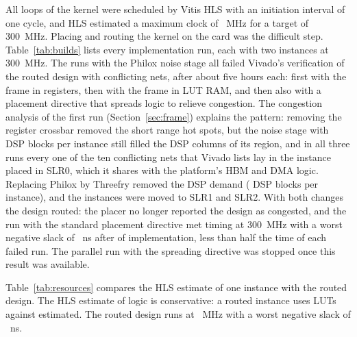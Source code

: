 All loops of the kernel were scheduled by Vitis HLS with an initiation interval of one cycle, and HLS estimated a
maximum clock of \NumHlsFmax{}~MHz for a target of 300~MHz. Placing and routing the kernel on the card was the
difficult step. Table~\ref{tab:builds} lists every implementation run, each with two instances at 300~MHz. The
\NumFailedBuilds{} runs with the Philox noise stage all failed Vivado's verification of the routed design with
conflicting nets, after about five hours each: first with the frame in registers, then with the frame in LUT RAM, and
then also with a placement directive that spreads logic to relieve congestion. The congestion analysis of the first
run (Section~\ref{sec:frame}) explains the pattern: removing the register crossbar removed the short range hot spots,
but the noise stage with \NumPhiloxDsp{} DSP blocks per instance still filled the DSP columns of its region, and in
all three runs every one of the ten conflicting nets that Vivado lists lay in the instance placed in SLR0, which it
shares with the platform's HBM and DMA logic. Replacing Philox by Threefry removed the DSP demand (\NumHlsDsp{} DSP blocks per instance), and the
instances were moved to SLR1 and SLR2. With both changes the design routed: the placer no longer reported the
design as congested, and the run with the standard placement directive met timing at 300~MHz with a worst negative
slack of \NumWns{}~ns after \NumTfImplTime{} of implementation, less than half the time of each failed run. The
parallel run with the spreading directive was stopped once this result was available.

\begin{table}[t]
\caption{Implementation runs of the kernel on the Alveo U55C, two instances at a 300~MHz target. Frame: frame stage
storage. Generator: Philox4x32-10 or Threefry4x32-20. SLRs: the regions of the two instances. Placement: Vivado
directive ExtraTimingOpt (timing) or AltSpreadLogic\_high (spread). DSP: DSP blocks per instance (HLS). Time: Vivado
placement and routing. All runs used the
same post route optimisation settings.}\label{tab:builds}

\end{table}

Table~\ref{tab:resources} compares the HLS estimate of one instance with the routed design. The HLS estimate of logic is
conservative: a routed instance uses \NumRoutedLutOne{} LUTs
against \NumHlsLut{} estimated. The routed design runs at \NumKernelMhz{}~MHz with a worst negative slack of
\NumWns{}~ns.

